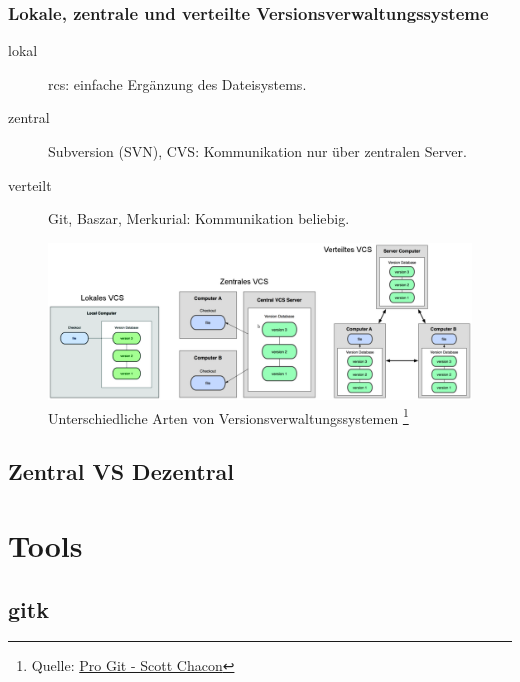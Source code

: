\documentclass{beamer}
\begin{document}
\begin{frame}\frametitle{Lokale, zentrale und verteilte Versionsverwaltungssysteme}
\begin{description}
\item[lokal] rcs: einfache Ergänzung des Dateisystems.
\item[zentral] Subversion (SVN), CVS: Kommunikation nur über zentralen Server.
\item[verteilt] Git, Baszar, Merkurial: Kommunikation beliebig.

\end{description}

\begin{figure}
\includegraphics[scale=.15]{Bilder/VCSArten}
\caption{Unterschiedliche Arten von Versionsverwaltungssystemen
 \footnote{Quelle: \href{http://progit.org/}{Pro Git - Scott Chacon}}}
\end{figure}
\end{frame}

\subsection{Zentral VS Dezentral}


\section{Tools}

\subsection{gitk}
\end{document}
